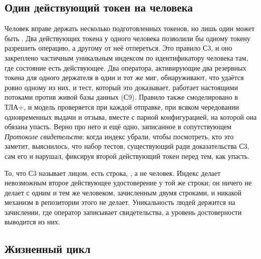 \subsection{Один действующий токен на человека}

Человек вправе держать несколько подготовленных токенов, но лишь один может быть .
Два действующих токена у одного человека позволили бы одному токену разрешить операцию, а другому
от неё отпереться. Это правило С3, и оно закреплено частичным уникальным индексом
 по идентификатору человека там, где состояние есть
действующее. Два оператора, активирующие два резервных токена для одного держателя в один и тот
же миг, обнаруживают, что удаётся ровно одному из них, и тест, который это доказывает, работает
настоящими потоками против живой базы данных (С9). Правило также смоделировано в ТЛА+, и модель
проверяется при каждой отправке, при всяком чередовании одновременных выдачи и отзыва, вместе с
парной конфигурацией, на которой она обязана упасть. Верно про него и ещё одно, записанное в
сопутствующем \emph{Протоколе свидетельств}: когда индекс убрали, чтобы посмотреть, кто это
заметит, выяснилось, что набор тестов, существующий ради доказательства С3, сам его и нарушал,
фиксируя второй действующий токен перед тем, как упасть. \sImpl

То, что С3 называет лицом, есть строка, , а не человек. Индекс делает
невозможным второе действующее удостоверение у той же строки; он ничего не делает с одним и тем же
человеком, зачисленным двумя строками, и никакой механизм в репозитории этого не делает.
Уникальность людей держится на зачислении, где оператор записывает свидетельства, а уровень
достоверности выводится из них.

\subsection{Жизненный цикл}


